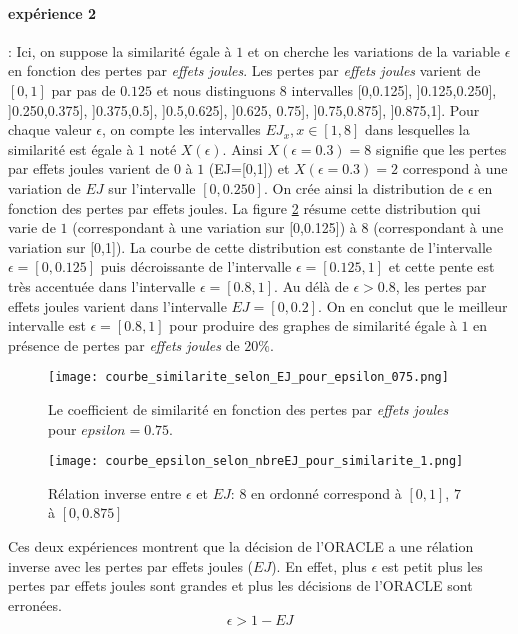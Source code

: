 \paragraph{exp\'erience 2} :
Ici, on suppose la similarit\'e \'egale \`a $1$ et on cherche les variations de la variable $\epsilon$ en fonction des pertes par {\em effets joules}. 
Les pertes par {\em effets joules} varient de $[0,1]$ par pas de $0.125$ et nous distinguons $8$ intervalles [0,0.125], ]0.125,0.250], ]0.250,0.375], ]0.375,0.5], ]0.5,0.625], ]0.625, 0.75], ]0.75,0.875], ]0.875,1]. 
Pour chaque valeur $\epsilon$, on compte les intervalles $EJ_x, x \in [1,8]$ dans lesquelles la similarit\'e est \'egale \`a $1$ not\'e $X(\epsilon)$. Ainsi $X(\epsilon=0.3) = 8$ signifie que  les pertes par effets joules varient de $0$ \`a $1$ (EJ=[0,1]) et $X(\epsilon=0.3) = 2$ correspond \`a une variation de $EJ$ sur l'intervalle $[0,0.250]$.
On cr\'ee ainsi la distribution de $\epsilon$ en fonction des pertes par effets joules.
La figure \ref{courbeEpsilonEJ}  r\'esume cette distribution qui varie de $1$ (correspondant \`a une variation sur [0,0.125]) \`a $8$ (correspondant \`a une variation sur [0,1]).
La courbe de cette distribution est constante de l'intervalle $\epsilon = [0,0.125]$ puis  d\'ecroissante de l'intervalle $\epsilon =[0.125,1]$ et cette pente est tr\`es accentu\'ee dans l'intervalle $\epsilon = [0.8, 1]$. 
Au d\'el\`a  de $\epsilon > 0.8$, les pertes par effets joules varient dans l'intervalle $EJ=[0,0.2]$.
On en conclut que le meilleur intervalle est $\epsilon = [0.8, 1]$ pour produire des graphes de similarit\'e \'egale \`a $1$ en pr\'esence de pertes par {\em effets joules} de $20\%$.

\begin{figure}
\centering
\texttt{[image: courbe\_similarite\_selon\_EJ\_pour\_epsilon\_075.png]}
\caption{ Le coefficient de similarit\'e en fonction des pertes par {\em effets joules} pour $epsilon=0.75$.}
\label {courbeEJCoef}
\end{figure}
\begin{figure}
\centering
\texttt{[image: courbe\_epsilon\_selon\_nbreEJ\_pour\_similarite\_1.png]}
\caption{ R\'elation inverse entre $\epsilon$ et $EJ$: $8$ en ordonn\'e correspond \`a $[0,1]$, $7$ \`a $[0, 0.875]$ }
\label {courbeEpsilonEJ}
\end{figure}

Ces deux exp\'eriences montrent que la d\'ecision de l'ORACLE  a une r\'elation inverse avec les pertes par effets joules ($EJ$). En effet, plus $\epsilon$ est petit plus les pertes par effets joules sont grandes et plus les d\'ecisions de l'ORACLE sont erron\'ees.
\begin{equation}
	\epsilon > 1 - EJ
\end{equation}


